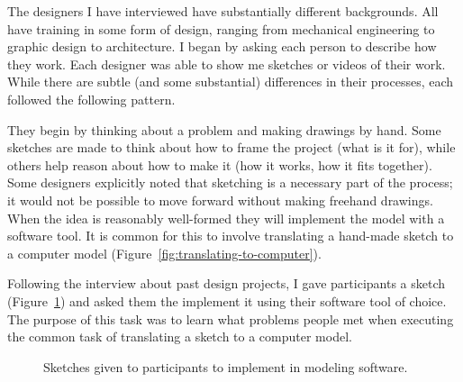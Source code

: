 \documentclass[12pt]{article}
\begin{document}
The designers I have interviewed have substantially different
backgrounds. All have training in some form of design, ranging from
mechanical engineering to graphic design to architecture. I began by
asking each person to describe how they work. Each designer was able
to show me sketches or videos of their work. While there are subtle
(and some substantial) differences in their processes, each followed
the following pattern.

They begin by thinking about a problem and making drawings by
hand. Some sketches are made to think about how to frame the project
(what is it for), while others help reason about how to make it (how
it works, how it fits together). Some designers explicitly noted that
sketching is a necessary part of the process; it would not be possible
to move forward without making freehand drawings. When the idea is
reasonably well-formed they will implement the model with a software
tool. It is common for this to involve translating a hand-made sketch
to a computer model (Figure~\ref{fig:translating-to-computer}). 

Following the interview about past design projects, I gave
participants a sketch (Figure~\ref{fig:interview-sketch}) and asked
them the implement it using their software tool of choice. The purpose
of this task was to learn what problems people met when executing the
common task of translating a sketch to a computer model.

\begin{figure}[h]
\centering 
{}
\hspace{1cm} 
\caption{Sketches given to participants to implement in modeling software.}
\label{fig:interview-sketch}
\end{figure}
\end{document}
